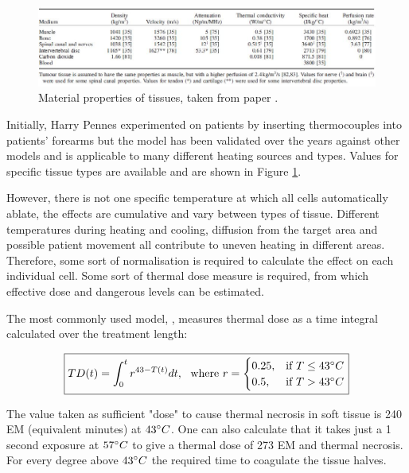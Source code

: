 \documentclass[11pt]{article} %
\begin{document}
	
	
	\begin{figure}
		\centering
		\includegraphics[width=1\linewidth]{Report_images/tissueproperties}
		\caption{Material properties of tissues, taken from paper \cite{Scott2014}.}
		\label{fig:tissueproperties}
	\end{figure}
	
	Initially, Harry Pennes experimented on patients by inserting thermocouples into patients' forearms but the model has been validated over the years against other models and is applicable to many different heating sources and types. Values for specific tissue types are available and are shown in Figure \ref{fig:tissueproperties}. 
	
	However, there is not one specific temperature at which all cells automatically ablate, the effects are cumulative and vary between types of tissue. Different temperatures during heating and cooling, diffusion from the target area and possible patient movement all contribute to uneven heating in different areas. Therefore, some sort of normalisation is required to calculate the effect on each individual cell. Some sort of thermal dose measure is required, from which effective dose and dangerous levels can be estimated. 
	
	
	
	The most commonly used model, \cite{Sapareto1984a},  measures thermal dose as a time integral calculated over the treatment length:
	
\begin{equation}
\boxed{TD(t)=\int_{0}^{t}r^{43-T(t)}dt,\ \ \text{where  } r=
\begin{cases}
0.25, & \text{if}\ T\leq 43 \degree C \\
0.5, & \text{if}\ T>43 \degree C 
\end{cases}}
\label{Sapereto}
\end{equation}
	
	The value taken as sufficient "dose" to cause thermal necrosis in soft tissue is 240 EM (equivalent minutes) at $43 \degree C $. One can also calculate that it takes just a 1 second exposure at $57 \degree C $ to give a thermal dose of 273 EM and thermal necrosis. For every degree above  $43 \degree C $ the required time to coagulate the tissue halves. 
	
\end{document}
